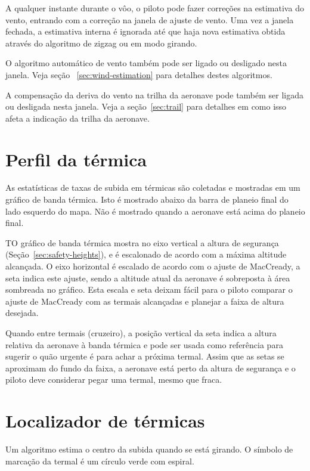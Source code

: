 A qualquer instante durante o vôo, o piloto pode fazer correções na estimativa do vento, entrando com a correção na janela de ajuste de vento.  Uma vez a janela fechada, a estimativa interna é ignorada até que haja nova estimativa obtida através do algoritmo de zigzag ou em modo girando.

O algoritmo automático de vento também pode ser ligado ou desligado nesta janela.  Veja seção ~\ref{sec:wind-estimation}
para detalhes destes algoritmos.

A compensação da deriva do vento na trilha da aeronave pode também ser ligada ou desligada nesta janela.  Veja a seção~\ref{sec:trail} para detalhes em como isso afeta a indicação da trilha da aeronave.  

\section{Perfil da térmica}

As estatísticas de taxas de subida em térmicas são coletadas e mostradas em um gráfico de banda térmica.  Isto é mostrado abaixo da barra de planeio final do lado esquerdo do mapa.  Não é mostrado quando a aeronave está acima do planeio final.

\vskip 2cm

TO gráfico de banda térmica mostra no eixo vertical a altura de segurança  (Seção~\ref{sec:safety-heights}), e é escalonado de acordo com a máxima altitude alcançada.  O eixo horizontal é escalado de acordo com o ajuste de MacCready, a seta indica este ajuste, sendo a altitude atual da aeronave é sobreposta à área sombreada no gráfico.    Esta escala e seta deixam fácil para o piloto comparar o ajuste de MacCready com as termais alcançadas e planejar a faixa de altura desejada.

Quando entre termais (cruzeiro), a posição vertical da seta indica a altura relativa da aeronave à banda térmica e pode ser usada como referência para sugerir o quão urgente é para achar a próxima termal.  Assim que as setas se aproximam do fundo da faixa, a aeronave está perto da altura de segurança e o piloto deve considerar pegar uma termal, mesmo que fraca.  


\section{Localizador de térmicas}
Um algoritmo estima o centro da subida quando se está girando.  O símbolo de marcação da termal é um círculo verde com espiral.

